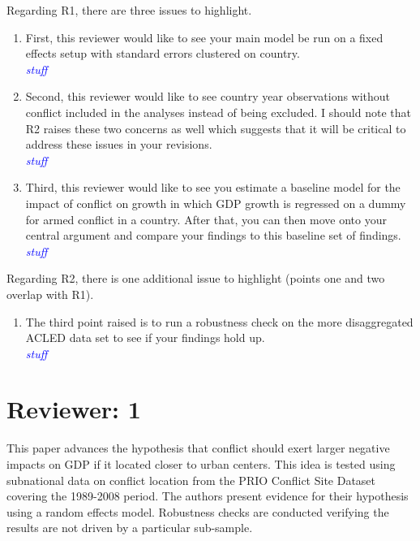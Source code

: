 \documentclass[12pt,onesided,fullpage]{amsart}
\begin{document}
Regarding R1, there are three issues to highlight. 
\begin{enumerate}
\item  First, this reviewer would like to see your main model be run on a fixed effects setup with standard errors clustered on country. \\

\textcolor{blue}{\emph{stuff}}

\item Second, this reviewer would like to see country year observations without conflict included in the analyses instead of being excluded. I should note that R2 raises these two concerns as well which suggests that it will be critical to address these issues in your revisions. \\

\textcolor{blue}{\emph{stuff}}

\item Third, this reviewer would like to see you estimate a baseline model for the impact of conflict on growth in which GDP growth is regressed on a dummy for armed conflict in a country. After that, you can then move onto your central argument and compare your findings to this baseline set of findings. \\

\textcolor{blue}{\emph{stuff}}

\end{enumerate}

Regarding R2, there is one additional issue to highlight (points one and two overlap with R1).

\begin{enumerate}
\item The third point raised is to run a robustness check on the more disaggregated ACLED data set to see if your findings hold up. \\

\textcolor{blue}{\emph{stuff}}

\end{enumerate}



\section{Reviewer: 1}

This paper advances the hypothesis that conflict should exert larger negative impacts on GDP if it located closer to urban centers. This idea is tested using subnational data on conflict location from the PRIO Conflict Site Dataset covering the 1989-2008 period. The authors present evidence for their hypothesis using a random effects model. Robustness checks are conducted verifying the results are not driven by a particular sub-sample.
\end{document}
